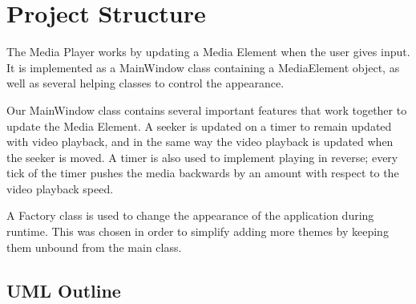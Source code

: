 \documentclass[10pt,conference,onecolumn,compsoc]{IEEEtran}
\begin{document}
\section{Project Structure}
The Media Player works by updating a Media Element when the user gives input. It is implemented as a MainWindow class containing a MediaElement object, as well as several helping classes to control the appearance. \medskip

Our MainWindow class contains several important features that work together to update the Media Element. A seeker is updated on a timer to remain updated with video playback, and in the same way the video playback is updated when the seeker is moved. A timer is also used to implement playing in reverse; every tick of the timer pushes the media backwards by an amount with respect to the video playback speed.   \par
A Factory class is used to change the appearance of the application during runtime. This was chosen in order to simplify adding more themes by keeping them unbound from the main class.

\subsection{UML Outline}
\end{document}
